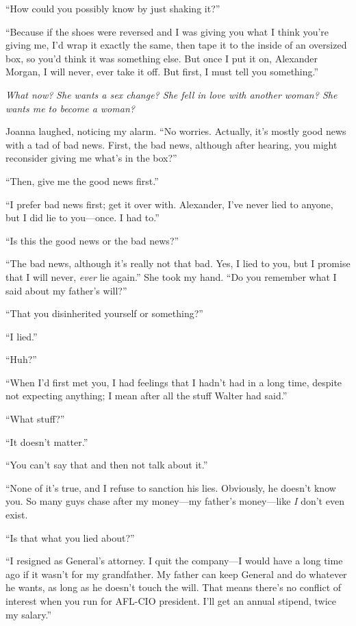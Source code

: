 ``How could you possibly know by just shaking it?''

``Because if the shoes were reversed and I was giving you what I think
you're giving me, I'd wrap it exactly the same, then tape it to the
inside of an oversized box, so you'd think it was something else. But
once I put it on, Alexander Morgan, I will never, ever take it off. But
first, I must tell you something.''

\emph{What now?} \emph{She wants a sex change? She fell in love with
another woman? She wants me to become a woman?}

Joanna laughed, noticing my alarm. ``No worries. Actually, it's mostly
good news with a tad of bad news. First, the bad news, although after
hearing, you might reconsider giving me what's in the box?''

``Then, give me the good news first.''

``I prefer bad news first; get it over with. Alexander, I've never lied
to anyone, but I did lie to you---once. I had to.''

``Is this the good news or the bad news?''

``The bad news, although it's really not that bad. Yes, I lied to you,
but I promise that I will never, \emph{ever} lie again.'' She took my
hand. ``Do you remember what I said about my father's will?''

``That you disinherited yourself or something?''

``I lied.''

``Huh?''

``When I'd first met you, I had feelings that I hadn't had in a long
time, despite not expecting anything; I mean after all the stuff Walter
had said.''

``What stuff?''

``It doesn't matter.''

``You can't say that and then not talk about it.''

``None of it's true, and I refuse to sanction his lies. Obviously, he
doesn't know you. So many guys chase after my money---my father's
money---like \emph{I} don't even exist.

``Is that what you lied about?''

``I resigned as General's attorney. I quit the company---I would have a
long time ago if it wasn't for my grandfather. My father can keep
General and do whatever he wants, as long as he doesn't touch the will.
That means there's no conflict of interest when you run for AFL-CIO
president. I'll get an annual stipend, twice my salary.''

